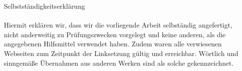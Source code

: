\documentclass[a4paper,oneside,12pt,titlepage]{article}
\begin{document}
\newpage
\renewcommand{\refname}{Literatur} 			%
\printbibliography
\small


\newpage
\Large{Selbstständigkeitserklärung}\\
\\
\small Hiermit erklären wir, dass wir die vorliegende Arbeit selbständig angefertigt, nicht anderweitig zu Prüfungszwecken vorgelegt und keine anderen, als die angegebenen Hilfsmittel verwendet haben. Zudem waren alle verwiesenen Webseiten zum Zeitpunkt der Linksetzung gültig und erreichbar. Wörtlich und sinngemäße Übernahmen aus anderen Werken sind als solche gekennzeichnet.
\\
\end{document}
